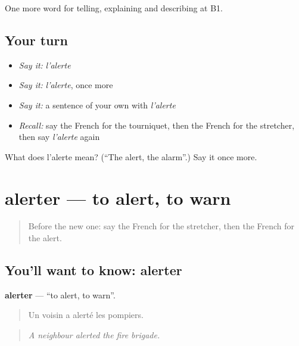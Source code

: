 \begin{grammarlens}[title={What you've built}]
One more word for telling, explaining and describing at B1.
\end{grammarlens}

\subsection*{Your turn}
\begin{itemize}
\raggedright
  \item \emph{Say it:} \emph{l'alerte}
  \item \emph{Say it:} \emph{l'alerte}, once more
  \item \emph{Say it:} a sentence of your own with \emph{l'alerte}
  \item \emph{Recall:} say the French for the tourniquet, then the French for the stretcher, then say \emph{l'alerte} again
\end{itemize}

\begin{tcolorbox}[breakable,colback=teal!4,colframe=teal!35!black,title={Before you move on}]
What does l'alerte mean? (\textquotedblleft{}The alert, the alarm\textquotedblright{}.) Say it once more.
\end{tcolorbox}
\section[alerter]{alerter — to alert, to warn}

\label{lesson:FR-C301-alerter}



\begin{quote}
Before the new one: say the French for the stretcher, then the French for the alert.
\end{quote}

\subsection*{You'll want to know: alerter}
\textbf{alerter} — \textquotedblleft{}to alert, to warn\textquotedblright{}.

\begin{quote}
Un voisin a alerté les pompiers.
\end{quote}

\begin{quote}
\emph{A neighbour alerted the fire brigade.}
\end{quote}

